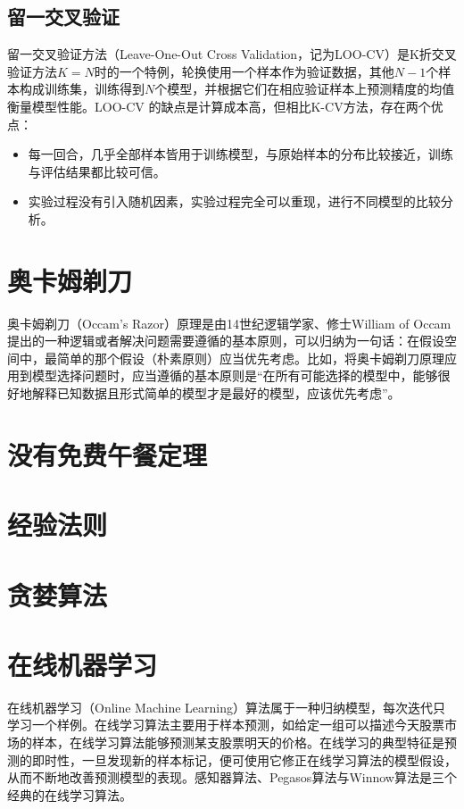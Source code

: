 \subsection{留一交叉验证}
留一交叉验证方法（Leave-One-Out Cross Validation，记为LOO-CV）是K折交叉验证方法$K=N$时的一个特例，轮换使用一个样本作为验证数据，其他$N-1$个样本构成训练集，训练得到$N$个模型，并根据它们在相应验证样本上预测精度的均值衡量模型性能。LOO-CV 的缺点是计算成本高，但相比K-CV方法，存在两个优点：
\begin{itemize}
  \item 每一回合，几乎全部样本皆用于训练模型，与原始样本的分布比较接近，训练与评估结果都比较可信。
  \item 实验过程没有引入随机因素，实验过程完全可以重现，进行不同模型的比较分析。
\end{itemize}

\section{奥卡姆剃刀}
奥卡姆剃刀（Occam's Razor）原理是由14世纪逻辑学家、修士William of Occam提出的一种逻辑或者解决问题需要遵循的基本原则，可以归纳为一句话：在假设空间中，最简单的那个假设（朴素原则）应当优先考虑。比如，将奥卡姆剃刀原理应用到模型选择问题时，应当遵循的基本原则是“在所有可能选择的模型中，能够很好地解释已知数据且形式简单的模型才是最好的模型，应该优先考虑”\cite{li2012statlearning}。

\section{没有免费午餐定理}%

\section{经验法则}%

\section{贪婪算法}%

\section{在线机器学习}
在线机器学习（Online Machine Learning）算法属于一种归纳模型，每次迭代只学习一个样例。在线学习算法主要用于样本预测，如给定一组可以描述今天股票市场的样本，在线学习算法能够预测某支股票明天的价格。在线学习的典型特征是预测的即时性，一旦发现新的样本标记，便可使用它修正在线学习算法的模型假设，从而不断地改善预测模型的表现。感知器算法、Pegasos算法与Winnow算法是三个经典的在线学习算法。

